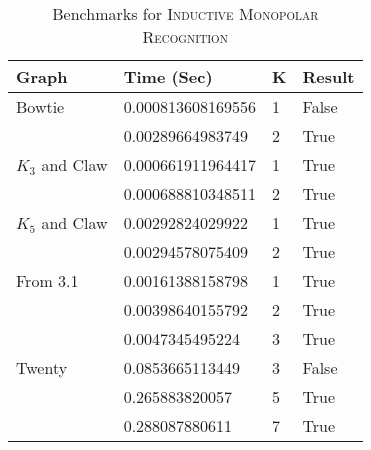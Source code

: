 \documentclass[11pt]{article}
\begin{document}
\begin{table}[h]\label{fig:irresults}
\begin{center}
\begin{tabu} to 0.9\textwidth { | X[l] X[l] X[c] X[c] | }
\hline
Graph & Time (Sec) & K & Result \\
[0.5ex]
\hline
\hline
Bowtie & 0.000813608169556 & 1 & False \\
[0.3ex]
  & 0.00289664983749 & 2 & True \\
[0.3ex]
\hline
$K_3$ and Claw & 0.000661911964417 & 1 & True \\
[0.3ex]
 & 0.000688810348511 & 2 & True \\
[0.3ex]
\hline
$K_5$ and Claw & 0.00292824029922 & 1 & True \\
[0.3ex]
 & 0.00294578075409 & 2 & True \\
[0.3ex]
\hline
From 3.1 & 0.00161388158798 & 1 & True \\
[0.3ex]
 & 0.00398640155792 & 2 & True \\
[0.3ex]
 & 0.0047345495224 & 3 & True \\
[0.3ex]
\hline
Twenty & 0.0853665113449 & 3 & False \\
[0.3ex]
  & 0.265883820057 & 5 & True \\
[0.3ex]
 & 0.288087880611 & 7 & True \\
[0.3ex]
\hline
\end{tabu}
\caption{Benchmarks for \textsc{Inductive Monopolar Recognition}}
\end{center}
\end{table}
\end{document}
